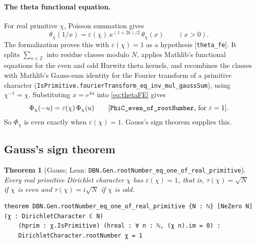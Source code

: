\documentclass[11pt]{article}
\newtheorem{theorem}{Theorem}[section]
\theoremstyle{definition}
\newcommand{\lean}[1]{\texttt{#1}}
\newcommand{\Z}{\mathbb{Z}}
\begin{document}
\paragraph{The theta functional equation.} For real primitive $\chi$, Poisson summation gives
\begin{equation}\label{eq:thetaFE}
\theta_\chi(1/x) = \varepsilon(\chi)\,x^{(1+2k)/2}\,\theta_\chi(x)\qquad(x > 0).
\end{equation}
The formalization proves this with $\varepsilon(\chi) = 1$ as a hypothesis [\lean{theta\_\allowbreak{}fe}]. It splits $\sum_{n\in\Z}$ into residue classes modulo $N$, applies Mathlib's functional equations for the even and odd Hurwitz theta kernels, and recombines the classes with Mathlib's Gauss-sum identity for the Fourier transform of a primitive character (\lean{IsPrimitive.fourierTransform\_\allowbreak{}eq\_\allowbreak{}inv\_\allowbreak{}mul\_\allowbreak{}gaussSum}), using $\chi^{-1} = \chi$. Substituting $x = e^{4u}$ into \eqref{eq:thetaFE} gives
\[
\Phi_\chi(-u) = \varepsilon(\chi)\,\Phi_\chi(u)\qquad\text{[\lean{PhiC\_\allowbreak{}even\_\allowbreak{}of\_\allowbreak{}rootNumber}, for } \varepsilon = 1\text{]}.
\]
So $\Phi_\chi$ is even exactly when $\varepsilon(\chi) = 1$. Gauss's sign theorem supplies this.

\subsection{Gauss's sign theorem}\label{sec:gauss}

\begin{theorem}[Gauss; Lean: \lean{DBN.Gen.rootNumber\_\allowbreak{}eq\_\allowbreak{}one\_\allowbreak{}of\_\allowbreak{}real\_\allowbreak{}primitive}]\label{thm:gauss}
Every real primitive Dirichlet character $\chi$ has $\varepsilon(\chi) = 1$, that is, $\tau(\chi) = \sqrt N$ if $\chi$ is even and $\tau(\chi) = i\sqrt N$ if $\chi$ is odd.
\end{theorem}

\begin{lstlisting}
theorem DBN.Gen.rootNumber_eq_one_of_real_primitive {N : ℕ} [NeZero N] (χ : DirichletCharacter ℂ N)
    (hprim : χ.IsPrimitive) (hreal : ∀ n : ℕ, (χ n).im = 0) :
    DirichletCharacter.rootNumber χ = 1
\end{lstlisting}
\end{document}
